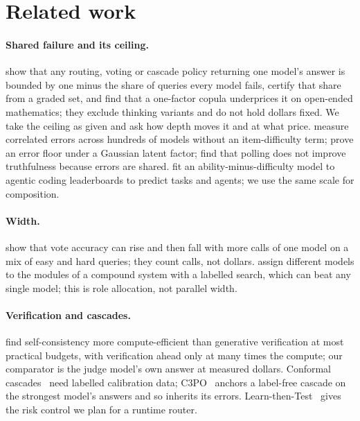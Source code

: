 \documentclass{article}
\begin{document}
\section{Related work}
\label{sec:related}

\paragraph{Shared failure and its ceiling.} \citet{chen2026cofailure} show that any routing, voting or cascade policy
returning one model's answer is bounded by one minus the share of queries every model fails, certify that share from a
graded set, and find that a one-factor copula underprices it on open-ended mathematics; they exclude thinking variants
and do not hold dollars fixed. We take the ceiling as given and ask how depth moves it and at what price.
\citet{kim2025correlated} measure correlated errors across hundreds of models without an item-difficulty term;
\citet{turkmen2026ensemble} prove an error floor under a Gaussian latent factor; \citet{denisovblanch2026consensus}
find that polling does not improve truthfulness because errors are shared. \citet{ge2026psychometrics} fit an
ability-minus-difficulty model to agentic coding leaderboards to predict tasks and agents; we use the same scale for
composition.

\paragraph{Width.} \citet{chen2024morecalls} show that vote accuracy can rise and then fall with more calls of one model
on a mix of easy and hard queries; they count calls, not dollars. \citet{chen2025llmselector} assign different models to
the modules of a compound system with a labelled search, which can beat any single model; this is role allocation, not
parallel width.

\paragraph{Verification and cascades.} \citet{singhi2025solve} find self-consistency more compute-efficient than
generative verification at most practical budgets, with verification ahead only at many times the compute; our
comparator is the judge model's own answer at measured dollars. Conformal cascades~\cite{dou2026conformal} need
labelled calibration data; C3PO~\cite{valkanas2025c3po} anchors a label-free cascade on the strongest model's answers
and so inherits its errors. Learn-then-Test~\cite{angelopoulos2021ltt} gives the risk control we plan for a runtime
router.
\end{document}
